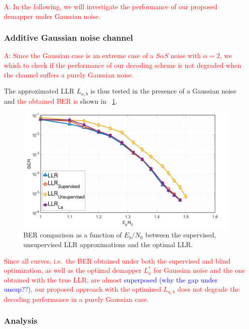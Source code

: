 \documentclass[a4paper]{IEEEtran}
\begin{document}
\textcolor{red}{A: In the following, we will investigate the
  performance of our proposed demapper under Gaussian
  noise. }


\subsubsection{Additive Gaussian noise channel}


\textcolor{red}{A: Since the Gaussian case is an extreme
  case of a $S\alpha S$ noise with $\alpha=2$, we whish to
  check if the performance of our decoding scheme is not
  degraded when the channel suffers a purely Gaussian
  noise.}

The approximated LLR $L_{a,b}$ is thus tested in the
presence of a Gaussian noise and \textcolor{red}{the
  obtained BER is} shown in \figurename~\ref{fig:18}.

\begin{figure}
  \centering
  \includegraphics[width=\linewidth]{fig-18}
  \caption{BER comparison as a function of $E_b/N_0$ between
    the supervised, unsupervised LLR approximations and the
    optimal LLR.}
  \label{fig:18}
\end{figure}

\textcolor{red}{Since all curves, i.e.\ the BER obtained
  under both the supervised and blind optimization, as well
  as the optimal demapper $L_a^*$ for Gaussian noise and the
  one obtained with the true LLR, are almost
  \textcolor{blue}{superposed (why the gap under unsup??)},
  our proposed approach with the optimized $L_{a,b}$ does
  not degrade the decoding performance in a purely Gaussian
  case.}


\subsubsection{Analysis}
\end{document}
